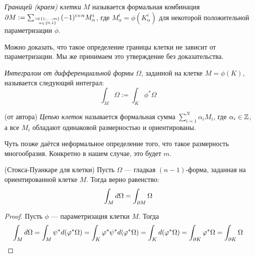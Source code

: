 \begin{definition}
	\textit{Границей (краем) клетки} $M$ называется формальная комбинация $\partial M := \sum_{i \in \{1, \ldots, m\} \atop {\alpha \in \{0, 1\}}} (-1)^{i + \alpha} M_\alpha^i$, где $M_\alpha^i = \phi(K_\alpha^i)$ для некоторой положительной параметризации $\phi$.
\end{definition}

\begin{note}
	Можно доказать, что такое определение границы клетки не зависит от параметризации. Мы же принимаем это утверждение без доказательства.
\end{note}

\begin{definition}
	\textit{Интегралом от дифференциальной формы} $\Omega$, заданной на клетке $M = \phi(K)$, называется следующий интеграл:
	\[
		\int_M \Omega := \int_K \phi^*\Omega
	\]
\end{definition}

\begin{definition} (от автора)
	\textit{Цепью клеток} называется формальная сумма $\sum_{i = 1}^N \alpha_i M_i$, где $\alpha_i \in \mathbb{Z}$, а все $M_i$ обладают одинаковой размерностью и ориентированы.
\end{definition}

\begin{anote}
	Чуть позже даётся неформальное определение того, что такое размерность многообразия. Конкретно в нашем случае, это будет $m$.
\end{anote}

\begin{theorem} (Стокса-Пуанкаре для клетки)
	Пусть $\Omega$ --- гладкая $(n - 1)$-форма, заданная на ориентированной клетке $M$. Тогда верно равенство:
	\[
		\int_M d\Omega = \int_{\partial M} \Omega
	\]
\end{theorem}

\begin{proof}
	Пусть $\phi$ --- параметризация клетки $M$. Тогда
	\[
		\int_M d\Omega = \int_M \psi^* d(\varphi^*\Omega) = \int_K \varphi^* \psi^* d(\varphi^*\Omega) = \int_K d(\varphi^*\Omega) = \int_{\partial K} \varphi^*\Omega = \int_{\partial K} \Omega
	\]
\end{proof}